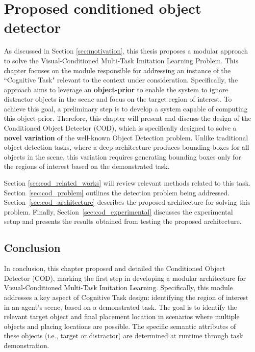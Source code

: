 \chapter{Proposed conditioned object detector}
\label{ch:cod}
As discussed in Section \ref{sec:motivation}, this thesis proposes a modular approach to solve the Visual-Conditioned Multi-Task Imitation Learning Problem. This chapter focuses on the module responsible for addressing an instance of the ``Cognitive Task" relevant to the context under consideration. Specifically, the approach aims to leverage an \textbf{object-prior} to enable the system to ignore distractor objects in the scene and focus on the target region of interest. To achieve this goal, a preliminary step is to develop a system capable of computing this object-prior. Therefore, this chapter will present and discuss the design of the Conditioned Object Detector (COD), which is specifically designed to solve a \textbf{novel variation} of the well-known Object Detection problem. Unlike traditional object detection tasks, where a deep architecture produces bounding boxes for all objects in the scene, this variation requires generating bounding boxes only for the regions of interest based on the demonstrated task.

Section \ref{sec:cod_related_works} will review relevant methods related to this task. 
Section~\ref{sec:cod_problem} outlines the detection problem being addressed. Section~\ref{sec:cod_architecture} describes the proposed architecture for solving this problem. Finally, Section~\ref{sec:cod_experimental} discusses the experimental setup and presents the results obtained from testing the proposed architecture.






\section{Conclusion}
In conclusion, this chapter proposed and detailed the Conditioned Object Detector (COD), marking the first step in developing a modular architecture for Visual-Conditioned Multi-Task Imitation Learning. Specifically, this module addresses a key aspect of Cognitive Task design: identifying the region of interest in an agent's scene, based on a demonstrated task. The goal is to identify the relevant target object and final placement location in scenarios where multiple objects and placing locations are possible. The specific semantic attributes of these objects (i.e., target or distractor) are determined at runtime through task demonstration.

